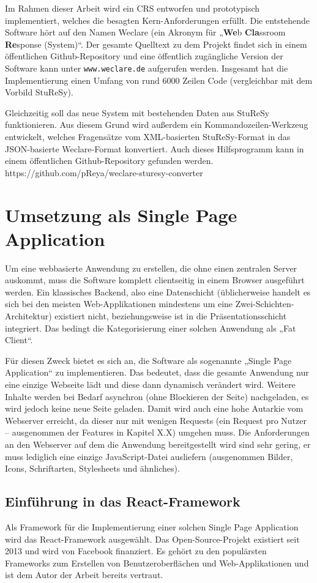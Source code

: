 Im Rahmen dieser Arbeit wird ein CRS entworfen und prototypisch implementiert, welches die besagten Kern-Anforderungen erfüllt. Die entstehende Software hört auf den Namen Weclare (ein Akronym für „\textbf{We}b \textbf{Cla}ssroom \textbf{Re}sponse (System)“. Der gesamte Quelltext zu dem Projekt findet sich in einem öffentlichen Github-Repository und eine öffentlich zugängliche Version der Software kann unter \texttt{www.weclare.de} aufgerufen werden. Insgesamt hat die Implementierung einen Umfang von rund 6000 Zeilen Code (vergleichbar mit dem Vorbild StuReSy).

Gleichzeitig soll das neue System mit bestehenden Daten aus StuReSy funktionieren. Aus diesem Grund wird außerdem ein Kommandozeilen-Werkzeug entwickelt, welches Fragensätze vom XML-basierten StuReSy-Format in das JSON-basierte Weclare-Format konvertiert. Auch dieses Hilfsprogramm kann in einem öffentlichen Github-Repository gefunden werden. https://github.com/pReya/weclare-sturesy-converter

\section{Umsetzung als Single Page Application}
\label{chap:react_einfuehrung}
Um eine webbasierte Anwendung zu erstellen, die ohne einen zentralen Server auskommt, muss die Software komplett clientseitig in einem Browser ausgeführt werden. Ein klassisches Backend, also eine Datenschicht (üblicherweise handelt es sich bei den meisten Web-Applikationen mindestens um eine Zwei-Schichten-Architektur) existiert nicht, beziehungsweise ist in die Präsentationsschicht integriert. Das bedingt die Kategorisierung einer solchen Anwendung als „Fat Client“.

Für diesen Zweck bietet es sich an, die Software als sogenannte „Single Page Application“ zu implementieren. Das bedeutet, dass die gesamte Anwendung nur eine einzige Webseite lädt und diese dann dynamisch verändert wird. Weitere Inhalte werden bei Bedarf asynchron (ohne Blockieren der Seite) nachgeladen, es wird jedoch keine neue Seite geladen. Damit wird auch eine hohe Autarkie vom Webserver erreicht, da dieser nur mit wenigen Requests (ein Request pro Nutzer – ausgenommen der Features in Kapitel X.X) umgehen muss. Die Anforderungen an den Webserver auf dem die Anwendung bereitgestellt wird sind sehr gering, er muss lediglich eine einzige JavaScript-Datei ausliefern (ausgenommen Bilder, Icons, Schriftarten, Stylesheets und ähnliches).

\subsection{Einführung in das React-Framework}
Als Framework für die Implementierung einer solchen Single Page Application wird das React-Framework\cite{web:react} ausgewählt. Das Open-Source-Projekt existiert seit 2013 und wird von Facebook finanziert. Es gehört zu den populärsten Frameworks zum Erstellen von Benutzeroberflächen und Web-Applikationen und ist dem Autor der Arbeit bereits vertraut.

